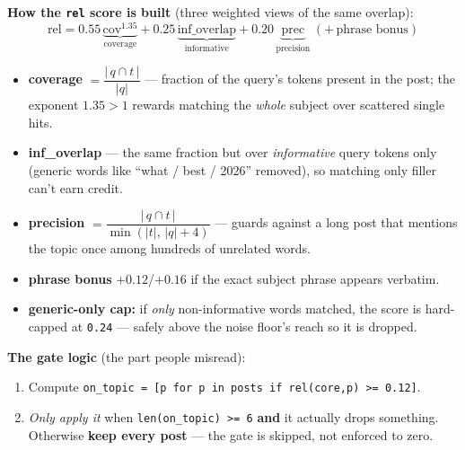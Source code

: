 \documentclass[11pt,a4paper]{article}
\newcommand{\code}[1]{\texttt{\small #1}}
\begin{document}
\smallskip
\noindent\textbf{How the \code{rel} score is built} (three weighted views of the same overlap):
\[
\text{rel}=0.55\,\underbrace{\text{cov}^{1.35}}_{\text{coverage}}
+0.25\,\underbrace{\text{inf\_overlap}}_{\text{informative}}
+0.20\,\underbrace{\text{prec}}_{\text{precision}}\;(+\,\text{phrase bonus})
\]
\begin{itemize}
\item \textbf{coverage} $=\dfrac{|\,q\cap t\,|}{|q|}$ --- fraction of the query's tokens present in
the post; the exponent $1.35>1$ rewards matching the \emph{whole} subject over scattered single
hits.
\item \textbf{inf\_overlap} --- the same fraction but over \emph{informative} query tokens only
(generic words like ``what / best / 2026'' removed), so matching only filler can't earn credit.
\item \textbf{precision} $=\dfrac{|\,q\cap t\,|}{\min(|t|,\,|q|+4)}$ --- guards against a long
post that mentions the topic once among hundreds of unrelated words.
\item \textbf{phrase bonus} $+0.12$/$+0.16$ if the exact subject phrase appears verbatim.
\item \textbf{generic-only cap:} if \emph{only} non-informative words matched, the score is
hard-capped at \code{0.24} --- safely above the noise floor's reach so it is dropped.
\end{itemize}

\noindent\textbf{The gate logic} (the part people misread):
\begin{enumerate}
\item Compute \code{on\_topic = [p for p in posts if rel(core,p) >= 0.12]}.
\item \emph{Only apply it} when \code{len(on\_topic) >= 6} \textbf{and} it actually drops
something. Otherwise \textbf{keep every post} --- the gate is skipped, not enforced to zero.
\end{enumerate}

\begin{center}
\end{center}
\end{document}
